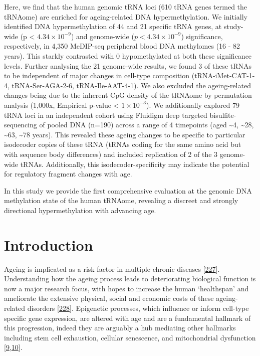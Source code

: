 \documentclass[
]{book}
\begin{document}
Here, we find that the human genomic tRNA loci (610 tRNA genes termed the tRNAome) are enriched for ageing-related DNA hypermethylation.
We initially identified DNA hypermethylation of 44 and 21 specific tRNA genes, at study-wide (p \textless{} \(4.34\times10^{-9}\)) and genome-wide (\(p < 4.34\times10^{-9}\)) significance, respectively, in 4,350 MeDIP-seq peripheral blood DNA methylomes (16 - 82 years).
This starkly contrasted with 0 hypomethylated at both these significance levels.
Further analysing the 21 genome-wide results, we found 3 of these tRNAs to be independent of major changes in cell-type composition (tRNA-iMet-CAT-1-4, tRNA-Ser-AGA-2-6, tRNA-Ile-AAT-4-1).
We also excluded the ageing-related changes being due to the inherent CpG density of the tRNAome by permutation analysis (1,000x, Empirical p-value \textless{} \(1\times10^{-3}\)).
We additionally explored 79 tRNA loci in an independent cohort using Fluidigm deep targeted bisulfite-sequencing of pooled DNA (n=190) across a range of 4 timepoints (aged \textasciitilde4, \textasciitilde28, \textasciitilde63, \textasciitilde78 years).
This revealed these ageing changes to be specific to particular isodecoder copies of these tRNA (tRNAs coding for the same amino acid but with sequence body differences) and included replication of 2 of the 3 genome-wide tRNAs.
Additionally, this isodecoder-specificity may indicate the potential for regulatory fragment changes with age.

In this study we provide the first comprehensive evaluation at the genomic DNA methylation state of the human tRNAome, revealing a discreet and strongly directional hypermethylation with advancing age.

\newpage

\hypertarget{introduction-2}{%
\section{Introduction}\label{introduction-2}}

Ageing is implicated as a risk factor in multiple chronic diseases {[}\protect\hyperlink{ref-Partridge2018}{227}{]}.
Understanding how the ageing process leads to deteriorating biological function is now a major research focus, with hopes to increase the human `healthspan' and ameliorate the extensive physical, social and economic costs of these ageing-related disorders {[}\protect\hyperlink{ref-Campisi2019}{228}{]}.
Epigenetic processes, which influence or inform cell-type specific gene expression, are altered with age and are a fundamental hallmark of this progression, indeed they are arguably a hub mediating other hallmarks including stem cell exhaustion, cellular senescence, and mitochondrial dysfunction {[}\protect\hyperlink{ref-Lopez-Otin2013}{9},\protect\hyperlink{ref-Booth2016}{10}{]}.
\end{document}
